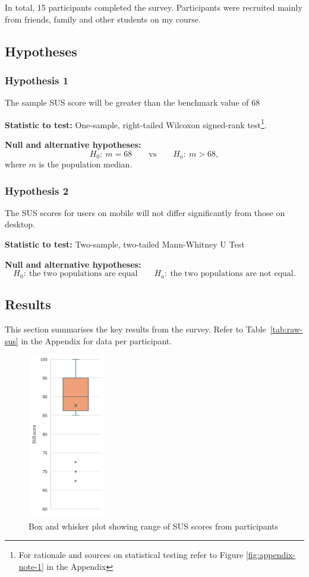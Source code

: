In total, 15 participants completed the survey. Participants were recruited
mainly from friends, family and other students on my course.

\subsection{Hypotheses}

\subsubsection{Hypothesis 1}
The sample SUS score will be greater than the benchmark value of 68

\textbf{Statistic to test:} One-sample, right-tailed Wilcoxon signed-rank
test\footnote{For rationale and sources on statistical testing refer to Figure
\ref{fig:appendix-note-1} in the Appendix}.

\textbf{Null and alternative hypotheses:}
\[
H_0:\ m = 68 \qquad\text{vs}\qquad H_a:\ m > 68,
\]
where \(m\) is the population median.

\subsubsection{Hypothesis 2}
The SUS scores for users on mobile will not differ significantly from those on
desktop.

\textbf{Statistic to test:} Two-sample, two-tailed Mann-Whitney U Test

\textbf{Null and alternative hypotheses:}
\[
H_0:\ \text{the two populations are equal} \qquad
H_a:\ \text{the two populations are not equal.}
\]

\subsection{Results}

This section summarises the key results from the survey. Refer to
Table~\ref{tab:raw-sus} in the Appendix for data per participant.

\begin{figure}[H]
    \centering
    \includegraphics[width=0.3\textwidth]{contents/part-4/fig4/box-whisker.png}
    \caption{Box and whisker plot showing range of SUS scores from participants}
    \label{fig:box-whisker}
\end{figure}

